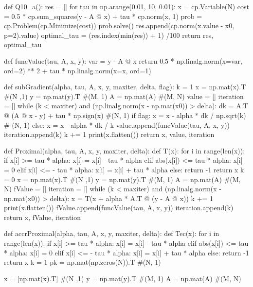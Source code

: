 \documentclass[12pt, a4 paper]{article}
\begin{document}
\begin{framed}
\begin{python}
def Q10_a():
    res = []
    for tau in np.arange(0.01, 10, 0.01):
        x = cp.Variable(N)
        cost = 0.5 * cp.sum_squares(y - A @ x) + tau * cp.norm(x, 1)
        prob = cp.Problem(cp.Minimize(cost))
        prob.solve()
        res.append(cp.norm(x.value - x0, p=2).value)
    optimal_tau = (res.index(min(res)) + 1) /100
    return res, optimal_tau

def funcValue(tau, A, x, y):
    var = y - A @ x
    return 0.5 * np.linalg.norm(x=var, ord=2) ** 2 + tau * np.linalg.norm(x=x, ord=1)

def subGradient(alpha, tau, A, x, y, maxiter, delta, flag):
    k = 1
    x = np.mat(x).T #(N ,1)
    y = np.mat(y).T #(M, 1)
    A = np.mat(A) #(M, N)
    value = []
    iteration = []
    while (k < maxiter) and (np.linalg.norm(x - np.mat(x0)) > delta):
        dk = A.T @ (A @ x - y) + tau * np.sign(x) #(N, 1)
        if flag:
            x = x - alpha * dk / np.sqrt(k) # (N, 1)
        else:
            x = x - alpha * dk / k
        value.append(funcValue(tau, A, x, y))
        iteration.append(k)
        k += 1
        print(x.flatten())
    return x, value, iteration

def Proximal(alpha, tau, A, x, y, maxiter, delta):
    def T(x):
        for i in range(len(x)):
            if x[i] >= tau * alpha:
                x[i] = x[i] - tau * alpha
            elif abs(x[i]) <= tau * alpha:
                x[i] = 0
            elif x[i] <= - tau * alpha:
                x[i] = x[i] + tau * alpha
            else:
                return -1
        return x
    k = 0
    x = np.mat(x).T #(N ,1)
    y = np.mat(y).T #(M, 1)
    A = np.mat(A) #(M, N)
    fValue = []
    iteration = []
    while (k < maxiter) and (np.linalg.norm(x - np.mat(x0)) > delta):
        x = T(x + alpha * A.T @ (y - A @ x))
        k += 1
        print(x.flatten())
        fValue.append(funcValue(tau, A, x, y))
        iteration.append(k)
    return x, fValue, iteration


def accrProximal(alpha, tau, A, x, y, maxiter, delta):
    def Tec(x):
        for i in range(len(x)):
            if x[i] >= tau * alpha:
                x[i] = x[i] - tau * alpha
            elif abs(x[i]) <= tau * alpha:
                x[i] = 0
            elif x[i] <= - tau * alpha:
                x[i] = x[i] + tau * alpha
            else:
                return -1
        return x
    k = 1
    pk = np.mat(np.zeros(N)).T #(N, 1)

    x = [np.mat(x).T] #(N ,1)
    y = np.mat(y).T #(M, 1)
    A = np.mat(A) #(M, N)


\end{python}
\end{framed}
\end{document}
